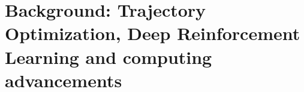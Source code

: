 \section{Background: Trajectory Optimization, Deep Reinforcement Learning and computing advancements}
\cite{rl:bellman1957markovian}
\cite{rl:bellman1960dynamic}
\cite{rl:rumelhart1986learning}
\cite{rl:kakade2001natural}
\cite{rl:peters2005natural}
\cite{rl:degris2012off}
\cite{rl:schulman2015trust}
\cite{rl:schulman2017proximal}
\cite{rl:pardo2018time}
\cite{rl:haarnoja2018soft}

\cite{frameworks::horizon_to}
